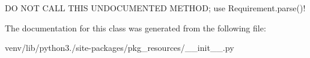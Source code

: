 \begin{DoxyVerb}DO NOT CALL THIS UNDOCUMENTED METHOD; use Requirement.parse()!\end{DoxyVerb}
 

The documentation for this class was generated from the following file\+:\begin{DoxyCompactItemize}
\item 
venv/lib/python3./site-\/packages/pkg\+\_\+resources/\+\_\+\+\_\+init\+\_\+\+\_\+.\+py\end{DoxyCompactItemize}
